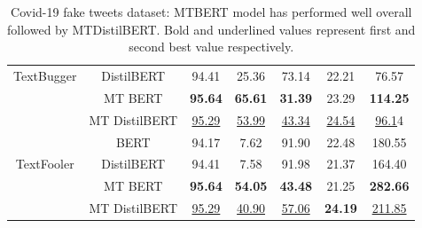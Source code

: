 \documentclass[%
	BCOR=8mm, %
	DIV=12,
	toc=bibliography, %
	toc=listof, %
	oneside, %
	egregdoesnotlikesansseriftitles, %
	]{scrbook}
\begin{document}
\begin{table}[H]
{\begin{tabular}{|c|c|c|c|c|c|c|}
TextBugger & DistilBERT &                94.41 &                    25.36 &                  73.14 &                     22.21 &            76.57 \\
                & MT BERT &               \textbf{ 95.64} &                    \textbf{65.61} &                  \textbf{31.39}&                     23.29 &           \textbf{114.25} \\
                & MT DistilBERT &                \underline{95.29} &                    \underline{53.99} &                  \underline{43.34} &                    \underline{ 24.54} &            \underline{96.1}4 \\
                \midrule
                 & BERT &                94.17 &                     7.62 &                  91.90 &                     22.48 &           180.55 \\
TextFooler & DistilBERT &                94.41 &                     7.58 &                  91.98 &                     21.37 &           164.40 \\
                & MT BERT &                \textbf{95.64} &                   \textbf{ 54.05} &                  \textbf{43.48} &                     21.25 &           \textbf{282.66} \\
                & MT DistilBERT &                \underline{95.29} &                    \underline{40.90} &                 \underline{ 57.06} &                    \textbf{ 24.19} &           \underline{211.85 }\\
            \bottomrule
        \end{tabular}
    }
    \caption[Experiment result of Covid-19 fake tweets]{Covid-19 fake tweets dataset: MTBERT model has performed well overall followed by MTDistilBERT. Bold and underlined values represent first and second best value respectively.}
    \label{table:FakeNewsExpRes}
\end{table}
\end{document}
